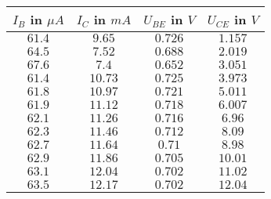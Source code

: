 \begin{tabular}{c|c|c|c}
\(I_B\) in \(\mu A\) & \(I_C\) in \(mA\) & \(U_{BE}\) in \(V\) & \(U_{CE}\) in \(V\) \\ \hline
\(61.4\) & \(9.65\) & \(0.726\) & \(1.157\) \\ 
\(64.5\) & \(7.52\) & \(0.688\) & \(2.019\) \\ 
\(67.6\) & \(7.4\) & \(0.652\) & \(3.051\) \\ 
\(61.4\) & \(10.73\) & \(0.725\) & \(3.973\) \\ 
\(61.8\) & \(10.97\) & \(0.721\) & \(5.011\) \\ 
\(61.9\) & \(11.12\) & \(0.718\) & \(6.007\) \\ 
\(62.1\) & \(11.26\) & \(0.716\) & \(6.96\) \\ 
\(62.3\) & \(11.46\) & \(0.712\) & \(8.09\) \\ 
\(62.7\) & \(11.64\) & \(0.71\) & \(8.98\) \\ 
\(62.9\) & \(11.86\) & \(0.705\) & \(10.01\) \\ 
\(63.1\) & \(12.04\) & \(0.702\) & \(11.02\) \\ 
\(63.5\) & \(12.17\) & \(0.702\) & \(12.04\)
\end{tabular}